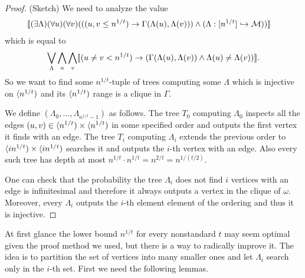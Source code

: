 \begin{proof}(Sketch) We need to analyze the value
\begin{align}
&\llbracket(\exists \Lambda)(\forall u)(\forall v)(((u,v \leq n^{1/t})\to\Gamma(\Lambda(u),\Lambda(v)))\land(\Lambda:[n^{1/t}]\hookrightarrow\mathcal{M}))\rrbracket
\end{align}
which is equal to
\begin{align}
\bigvee_\Lambda\bigwedge_u\bigwedge_v\llbracket(u\not=v < n^{1/t})\to(\Gamma(\Lambda(u),\Lambda(v))\land\Lambda(u)\not=\Lambda(v))\rrbracket.
\end{align}
So we want to find some $n^{1/t}$-tuple of trees computing some $\Lambda$ which is injective on $\langle n^{1/t})$ and its $\langle n^{1/t})$ range is a clique in $\Gamma$.

We define $(\Lambda_0,\dots,\Lambda_{n^{1/t}-1})$ as follows. The tree $T_0$ computing $\Lambda_0$ inspects all the edges $(u,v)\in\langle n^{1/t})\times\langle n^{1/t})$ in some specified order and outputs the first vertex it finds with an edge. The tree $T_i$ computing $\Lambda_i$ extends the previous order to $\langle in^{1/t})\times\langle in^{1/t})$ searches it and outputs the $i$-th vertex with an edge. Also every such tree has depth at most $n^{1/t}\cdot n^{1/t}=n^{2/t}=n^{1/(t/2)}$.

One can check that the probability the tree $\Lambda_i$ does not find $i$ vertices with an edge is infinitesimal and therefore it always outputs a vertex in the clique of $\omega$. Moreover, every $\Lambda_i$ outputs the $i$-th element element of the ordering and thus it is injective.
\end{proof}

At first glance the lower bound $n^{1/t}$ for every nonstandard $t$ may seem optimal given the proof method we used, but there is a way to radically improve it. The idea is to partition the set of vertices into many smaller ones and let $\Lambda_i$ search only in the $i$-th set. First we need the following lemmas.

